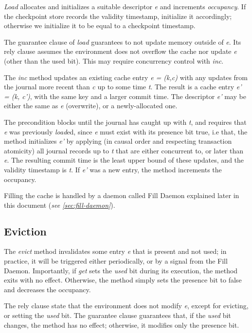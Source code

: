 \documentclass[twoside]{article}
\begin{document}
\emph{Load} allocates and initializes a suitable descriptor \emph{e} and
increments \emph{occupancy}.
If the checkpoint store records the validity timestamp, initialize it accordingly;
otherwise we initialize it to be equal to a checkpoint timestamp.

The guarantee clause of \emph{load} guarantees to not update memory outside of 
\emph{e}.
Its rely clause assumes the environment does not overflow the cache nor update
\emph{e} (other than the used bit).
This may require concurrency control with \emph{inc}.

The \emph{inc} method updates an existing cache entry \emph{e = (k,c)}
with any updates from the journal more recent than \emph{c} up to some
time \emph{t}.
The result is a cache entry \emph{e' = (k, c')}, with the same key and a
larger commit time.
The descriptor \emph{e'} may be either the same as \emph{e} (overwrite),
or a newly-allocated one.

The precondition blocks until the journal has caught up with \emph{t},
and requires that \emph{e} was previously \emph{load}ed, since \emph{e}
must exist with its presence bit true, i.e that,
the method initializes \emph{e'} by applying (in causal order and
respecting transaction atomicity) all journal records up to \emph{t}
that are either concurrent to, or later than \emph{e}.
The resulting commit time is the least upper bound of these updates, and
the validity timestamp is \emph{t}.
If \emph{e'} was a new entry, the method increments the occupancy.

Filling the cache is handled by a daemon called Fill Daemon explained later 
in this document (\emph{see \ref{sec:fill-daemon}}).

\subsection{Eviction}
\label{sec:eviction}

The \emph{evict} method invalidates some entry \emph{e} that is present
and not used; in practice, it will be triggered either periodically, or
by a signal from the Fill Daemon.
Importantly, if \emph{get} sets the \emph{used} bit during its
execution, the method exits with no effect.
Otherwise, the method simply sets the presence bit to false and
decreases the occupancy.

The rely clause state that the environment does not modify \emph{e}, except for 
evicting, or setting the \emph{used} bit.
The guarantee clause guarantees that, if the \emph{used} bit changes, the method has 
no effect; otherwise, it modifies only the presence bit.
\end{document}
